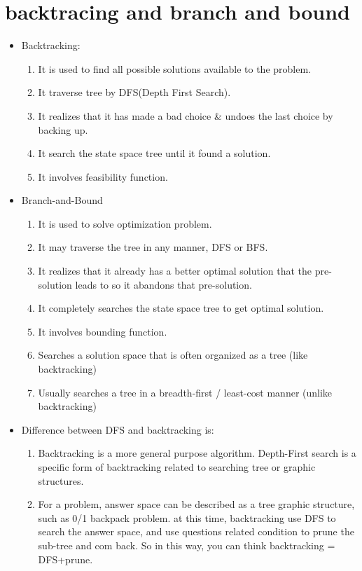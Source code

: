\documentclass[a4paper,12pt,twoside]{book}
\begin{document}
\section{backtracing and branch and bound}
\begin{itemize}
\item Backtracking:
\begin{enumerate}
\item It is used to find all possible solutions available to the problem.
\item It traverse tree by DFS(Depth First Search).
\item It realizes that it has made a bad choice \& undoes the last choice by backing up.
\item It search the state space tree until it found a solution.
\item It involves feasibility function.
\end{enumerate}


\item Branch-and-Bound
\begin{enumerate}
\item It is used to solve optimization problem.
\item It may traverse the tree in any manner, DFS or BFS.
\item It realizes that it already has a better optimal solution that the pre-solution leads to so it abandons that pre-solution.
\item It completely searches the state space tree to get optimal solution.
\item It involves bounding function.

\item Searches a solution space that is often organized as a tree (like backtracking)
\item Usually searches a tree in a breadth-first / least-cost manner (unlike backtracking)

\end{enumerate}

\item Difference between DFS and backtracking is:
\begin{enumerate}
\item Backtracking is a more general purpose algorithm. Depth-First search is a specific form of backtracking related to searching tree or graphic structures.  
\item For a problem, answer space can be described as a tree graphic structure, such as 0/1 backpack problem. at this time, backtracking use DFS to search the answer space, and use questions related condition to prune the sub-tree and com back. So in this way, you can think backtracking = DFS+prune. 


\end{enumerate}
\end{itemize}
\end{document}
